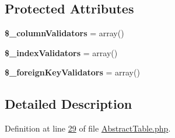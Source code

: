 \subsection*{Protected Attributes}
\begin{DoxyCompactItemize}
\item 
\hypertarget{classZendDbSchema__Validate__Db__Schema__AbstractTable_afe4141074e8564eb1bd9998ada65081d}{{\bfseries \$\-\_\-column\-Validators} = array()}\label{classZendDbSchema__Validate__Db__Schema__AbstractTable_afe4141074e8564eb1bd9998ada65081d}

\item 
\hypertarget{classZendDbSchema__Validate__Db__Schema__AbstractTable_ae4fd97089bab57541fa0165ac56844be}{{\bfseries \$\-\_\-index\-Validators} = array()}\label{classZendDbSchema__Validate__Db__Schema__AbstractTable_ae4fd97089bab57541fa0165ac56844be}

\item 
\hypertarget{classZendDbSchema__Validate__Db__Schema__AbstractTable_ab744e3326209d4dac74e97f51b7d46eb}{{\bfseries \$\-\_\-foreign\-Key\-Validators} = array()}\label{classZendDbSchema__Validate__Db__Schema__AbstractTable_ab744e3326209d4dac74e97f51b7d46eb}

\end{DoxyCompactItemize}


\subsection{Detailed Description}


Definition at line \hyperlink{AbstractTable_8php_source_l00029}{29} of file \hyperlink{AbstractTable_8php_source}{Abstract\-Table.\-php}.



